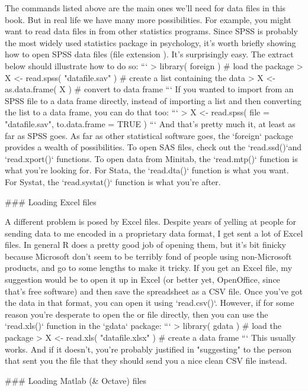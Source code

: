 The commands listed above are the main ones we'll need for data files in this book. But in real life we have many more possibilities. For example, you might want to read data files in from other statistics programs. Since SPSS is probably the most widely used statistics package in psychology, it's worth briefly showing how to open SPSS data files (file extension ). It's surprisingly easy. The extract below should illustrate how to do so:
```
> library( foreign )                 # load the package
> X <- read.spss( "datafile.sav" )   # create a list containing the data
> X <- as.data.frame( X )            # convert to data frame
```
If you wanted to import from an SPSS file to a data frame directly, instead of importing a list and then converting the list to a data frame, you can do that too:
```
> X <- read.spss( file = "datafile.sav", to.data.frame = TRUE )
```
And that's pretty much it, at least as far as SPSS goes.  As far as other statistical software goes, the `foreign` package provides a wealth of possibilities. To open SAS files, check out the `read.ssd()`and `read.xport()` functions. To open data from Minitab, the `read.mtp()` function is what you're looking for. For Stata, the `read.dta()` function is what you want. For Systat, the `read.systat()` function is what you're after. 

### Loading Excel files 

A different problem is posed by Excel files. Despite years of yelling at people for sending data to me encoded in a proprietary data format, I get sent a lot of Excel files. In general R does a pretty good job of opening them, but it's bit finicky because Microsoft don't seem to be terribly fond of people using non-Microsoft products, and go to some lengths to make it tricky. If you get an Excel file, my suggestion would be to open it up in Excel (or better yet, OpenOffice, since that's free software) and then save the spreadsheet as a CSV file. Once you've got the data in that format, you can open it using `read.csv()`. However, if for some reason you're desperate to open the  or  file directly, then you can use the `read.xls()` function in the `gdata` package:
```
> library( gdata )                   # load the package
> X <- read.xls( "datafile.xlsx" )   # create a data frame
``` 
This usually works. And if it doesn't, you're probably justified in "suggesting" to the person that sent you the file that they should send you a nice clean CSV file instead.

### Loading Matlab (\& Octave) files 

